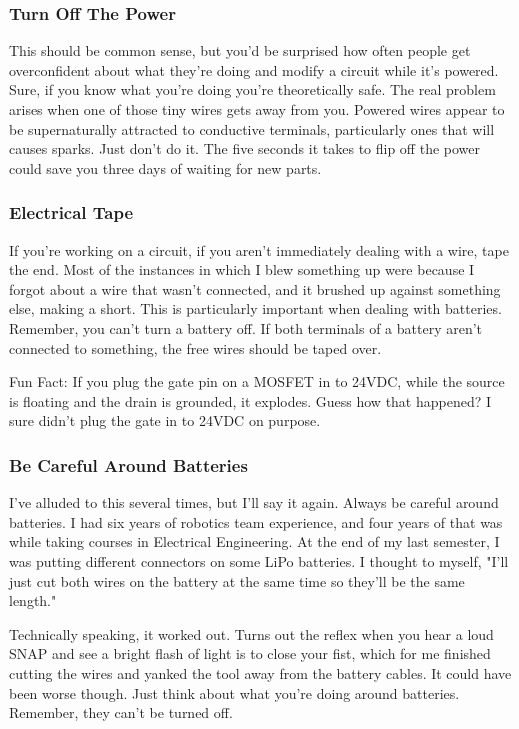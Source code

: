 \subsubsection{Turn Off The Power}

This should be common sense, but you'd be surprised how often people get overconfident about what they're doing and modify a circuit while it's powered. Sure, if you know what you're doing you're theoretically safe. The real problem arises when one of those tiny wires gets away from you. Powered wires appear to be supernaturally attracted to conductive terminals, particularly ones that will causes sparks. Just don't do it. The five seconds it takes to flip off the power could save you three days of waiting for new parts.

\subsubsection{Electrical Tape}

If you're working on a circuit, if you aren't immediately dealing with a wire, tape the end. Most of the instances in which I blew something up were because I forgot about a wire that wasn't connected, and it brushed up against something else, making a short. This is particularly important when dealing with batteries. Remember, you can't turn a battery off. If both terminals of a battery aren't connected to something, the free wires should be taped over.

Fun Fact: If you plug the gate pin on a MOSFET in to 24VDC, while the source is floating and the drain is grounded, it explodes. Guess how that happened? I sure didn't plug the gate in to 24VDC on purpose.

\subsubsection{Be Careful Around Batteries}

I've alluded to this several times, but I'll say it again. Always be careful around batteries. I had six years of robotics team experience, and four years of that was while taking courses in Electrical Engineering. At the end of my last semester, I was putting different connectors on some LiPo batteries. I thought to myself, "I'll just cut both wires on the battery at the same time so they'll be the same length."

Technically speaking, it worked out. Turns out the reflex when you hear a loud SNAP and see a bright flash of light is to close your fist, which for me finished cutting the wires and yanked the tool away from the battery cables. It could have been worse though. Just think about what you're doing around batteries. Remember, they can't be turned off.

